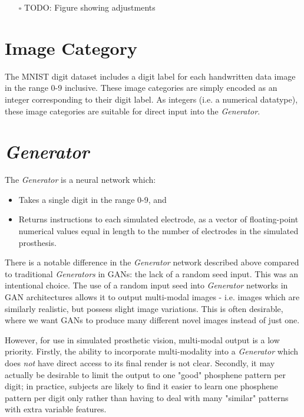 \documentclass[11pt]{book}
\begin{document}
\begin{itemize}
\item[{$\square$}] TODO: Figure showing adjustments
\end{itemize}

\section*{Image Category}
\label{sec:org617e7cf}

The MNIST digit dataset includes a digit label for each handwritten data image in the range 0-9 inclusive.
These image categories are simply encoded as an integer corresponding to their digit label.
As integers (i.e. a numerical datatype), these image categories are suitable for direct input into the \emph{Generator}.

\section*{\emph{Generator}}
\label{sec:org9597c77}

The \emph{Generator} is a neural network which:

\begin{itemize}
\item Takes a single digit in the range 0-9, and
\item Returns instructions to each simulated electrode, as a vector of floating-point numerical values equal in length to the number of electrodes in the simulated prosthesis.
\end{itemize}

There is a notable difference in the \emph{Generator} network described above compared to traditional \emph{Generators} in GANs: the lack of a random seed input.
This was an intentional choice.
The use of a random input seed into \emph{Generator} networks in GAN architectures allows it to output multi-modal images - i.e. images which are similarly realistic, but possess slight image variations.
This is often desirable, where we want GANs to produce many different novel images instead of just one.

However, for use in simulated prosthetic vision, multi-modal output is a low priority.
Firstly, the ability to incorporate multi-modality into a \emph{Generator} which does \emph{not} have direct access to its final render is not clear.
Secondly, it may actually be desirable to limit the output to one "good" phosphene pattern per digit; in practice, subjects are likely to find it easier to learn one phosphene pattern per digit only rather than having to deal with many "similar" patterns with extra variable features.
\end{document}
